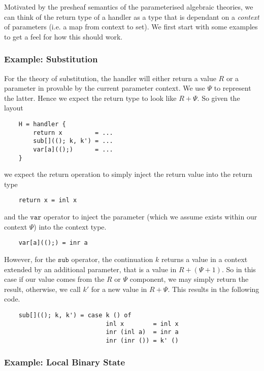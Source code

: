 \documentclass{scrartcl}
\theoremstyle{definition}
\newcommand{\sub}{\mathtt{sub}}
\newcommand{\var}{\mathtt{var}}
\newcommand{\PCtx}{\Psi}
\begin{document}
Motivated by the presheaf semantics of the parameterised algebraic theories, we can think of the return type of a handler as a type that is dependant on a \emph{context} of parameters (i.e. a map from context to set). We first start with some examples to get a feel for how this should work.

\subsubsection{Example: Substitution}

For the theory of substitution, the handler will either return a value $R$ or a parameter in provable by the current parameter context. We use $\PCtx$ to represent the latter. Hence we expect the return type to look like $R+\PCtx$. So given the layout
\begin{lstlisting}
    H = handler {
        return x         = ...
        sub[]((); k, k') = ...
        var[a](();)      = ...
    }
\end{lstlisting}
we expect the return operation to simply inject the return value into the return type
\begin{lstlisting}
    return x = inl x
\end{lstlisting}
and the $\var$ operator to inject the parameter (which we assume exists within our context $\PCtx$) into the context type.
\begin{lstlisting}
    var[a](();) = inr a
\end{lstlisting}
However, for the $\sub$ operator, the continuation $k$ returns a value in a context extended by an additional parameter, that is a value in $R + (\PCtx + 1)$. So in this case if our value comes from the $R$ or $\PCtx$ component, we may simply return the result, otherwise, we call $k'$ for a new value in $R+\PCtx$. This results in the following code.
\begin{lstlisting}
    sub[]((); k, k') = case k () of
                            inl x        = inl x
                            inr (inl a)  = inr a
                            inr (inr ()) = k' ()
\end{lstlisting}

\subsubsection{Example: Local Binary State}
\end{document}
